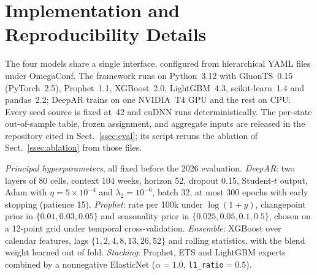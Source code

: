 \documentclass[runningheads]{llncs}
\begin{document}
\section{Implementation and Reproducibility Details}
\label{app:impl}
The four models share a single interface, configured from hierarchical
YAML files under OmegaConf. The framework runs on Python~3.12 with
GluonTS~0.15 (PyTorch~2.5), Prophet~1.1, XGBoost~2.0, LightGBM~4.3,
scikit-learn~1.4 and pandas~2.2; DeepAR trains on one NVIDIA~T4 GPU and
the rest on CPU. Every seed source is fixed at~42 and cuDNN runs
deterministically. The per-state out-of-sample table, frozen assignment,
and aggregate inputs are released in the repository cited in
Sect.~\ref{ssec:eval}; its script reruns the ablation of
Sect.~\ref{ssec:ablation} from those files.

\smallskip\noindent
\textit{Principal hyperparameters}, all fixed before the 2026 evaluation.
\textit{DeepAR}: two layers of 80 cells, context 104 weeks, horizon 52,
dropout 0.15, Student-$t$ output, Adam with $\eta{=}5{\times}10^{-4}$ and
$\lambda_2{=}10^{-6}$, batch 32, at most 300 epochs with early stopping
(patience 15). \textit{Prophet}: rate per 100k under $\log(1{+}y)$,
changepoint prior in $\{0.01,0.03,0.05\}$ and seasonality prior in
$\{0.025,0.05,0.1,0.5\}$, chosen on a 12-point grid under temporal
cross-validation. \textit{Ensemble}: XGBoost over calendar features, lags
$\{1,2,4,8,13,26,52\}$ and rolling statistics, with the blend weight
learned out of fold. \textit{Stacking}: Prophet, ETS and LightGBM experts
combined by a nonnegative ElasticNet ($\alpha{=}1.0$,
\texttt{l1\_ratio}${=}0.5$).
\end{document}
